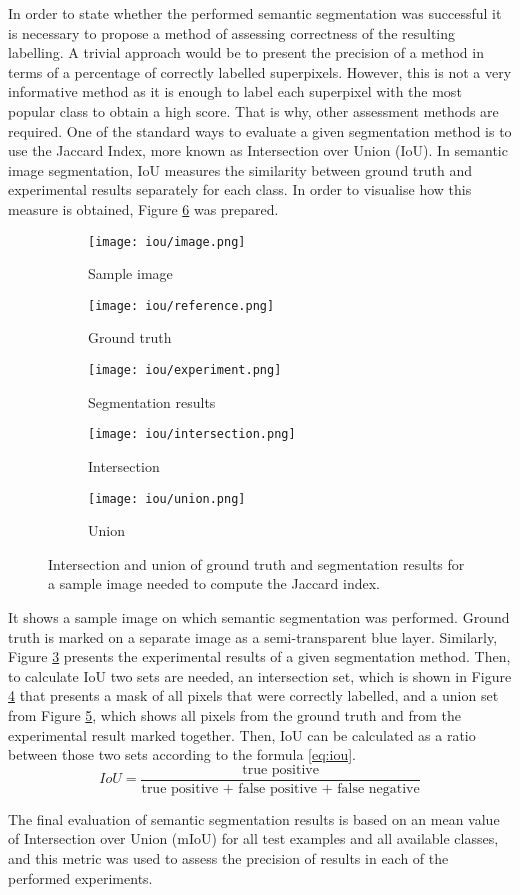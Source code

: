 In order to state whether the performed semantic segmentation was successful it is necessary to propose a method of assessing correctness of the resulting labelling. A trivial approach would be to present the precision of a method in terms of a percentage of correctly labelled superpixels. However, this is not a very informative method as it is enough to label each superpixel with the most popular class to obtain a high score. That is why, other assessment methods are required. One of the standard ways to evaluate a given segmentation method is to use the Jaccard Index\cite{IoU}, more known as Intersection over Union (IoU). In semantic image segmentation, IoU measures the similarity between ground truth and experimental results separately for each class. In order to visualise how this measure is obtained, Figure \ref{fig:iou_pepper_set} was prepared. 
\begin{figure}[ht]
 \centering
  \begin{subfigure}[h]{0.32\textwidth}
    \texttt{[image: iou/image.png]}
    \caption{Sample image}
    \label{fig:iou_sample_image}
  \end{subfigure}
  \begin{subfigure}[h]{0.32\textwidth}
    \texttt{[image: iou/reference.png]}
    \caption{Ground truth}
    \label{fig:iou_reference}
  \end{subfigure}
    \begin{subfigure}[h]{0.32\textwidth}
    \texttt{[image: iou/experiment.png]}
    \caption{Segmentation results}
    \label{fig:iou_experiment}
  \end{subfigure}
  \begin{subfigure}[h]{0.32\textwidth}
    \texttt{[image: iou/intersection.png]}
    \caption{Intersection}
    \label{fig:iou_intersection}
  \end{subfigure}
  \begin{subfigure}[h]{0.32\textwidth}
    \texttt{[image: iou/union.png]}
    \caption{Union}
    \label{fig:iou_union}
  \end{subfigure}
    \caption{Intersection and union of ground truth and segmentation results for a sample image needed to compute the Jaccard index.}%
    \label{fig:iou_pepper_set}
\end{figure}
It shows a sample image on which semantic segmentation was performed. Ground truth is marked on a separate image as a semi-transparent blue layer. Similarly, Figure \ref{fig:iou_experiment} presents the experimental results of a given segmentation method. Then, to calculate IoU two sets are needed, an intersection set, which is shown in Figure \ref{fig:iou_intersection} that presents a mask of all pixels that were correctly labelled, and a union set from Figure \ref{fig:iou_union}, which shows all pixels from the ground truth and from the experimental result marked together. Then, IoU can be calculated as a ratio between those two sets according to the formula \ref{eq:iou}.
\begin{equation}
    \label{eq:iou}
        IoU =\frac{\text{true positive}}{\text{true positive + false positive + false negative}} 
\end{equation}

The final evaluation of semantic segmentation results is based on an mean value of Intersection over Union (mIoU) for all test examples and all available classes, and this metric was used to assess the precision of results in each of the performed experiments.